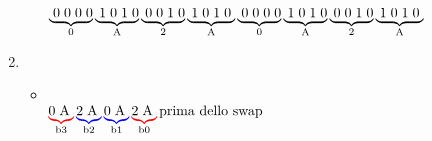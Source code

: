 \documentclass[a4paper, 12pt]{article} %
\begin{document}
\begin{enumerate}
\begin{itemize}
		$ \underbrace{\hspace{0.1cm}0\hspace{0.1cm}0\hspace{0.1cm}0\hspace{0.1cm}0} _{0} \underbrace{\hspace{0.1cm}1\hspace{0.1cm}0\hspace{0.1cm}1\hspace{0.1cm}0} _{\text{A}} \underbrace{\hspace{0.1cm}0 \hspace{0.1cm}0\hspace{0.1cm}1\hspace{0.1cm}0} _{2} \underbrace{\hspace{0.1cm}1\hspace{0.1cm}0\hspace{0.1cm}1\hspace{0.1cm}0\hspace{0.1cm}} _{\text{A}} \underbrace{\hspace{0.1cm}0\hspace{0.1cm}0\hspace{0.1cm}0\hspace{0.1cm}0} _{0} \underbrace{\hspace{0.1cm}1\hspace{0.1cm}0\hspace{0.1cm}1\hspace{0.1cm}0} _{\text{A}} \underbrace{\hspace{0.1cm}0 \hspace{0.1cm}0\hspace{0.1cm}1\hspace{0.1cm}0} _{2} \underbrace{\hspace{0.1cm}1\hspace{0.1cm}0\hspace{0.1cm}1\hspace{0.1cm}0\hspace{0.1cm}} _{\text{A}}$
	\end{itemize}
	\enlargethispage{24pt}
	\item {} \\
	\begin{itemize}
		\item {} \\
		$ \color{red}\underbrace{\normalcolor0\hspace{0.1cm}\text{A}\hspace{0.1cm}} _{\normalcolor\text{b3}} \color{blue}\underbrace{\normalcolor2\hspace{0.1cm}\text{A}\hspace{0.1cm}} _{\normalcolor\text{b2}} \color{blue}\underbrace{\normalcolor0\hspace{0.1cm}\text{A}\hspace{0.1cm}} _{\normalcolor\text{b1}} \color{red}\underbrace{\normalcolor2\hspace{0.1cm}\text{A}\hspace{0.1cm}} _{\normalcolor\text{b0}} \text{\normalcolor prima dello swap}$ \\

\end{itemize}
\end{enumerate}
\end{document}
